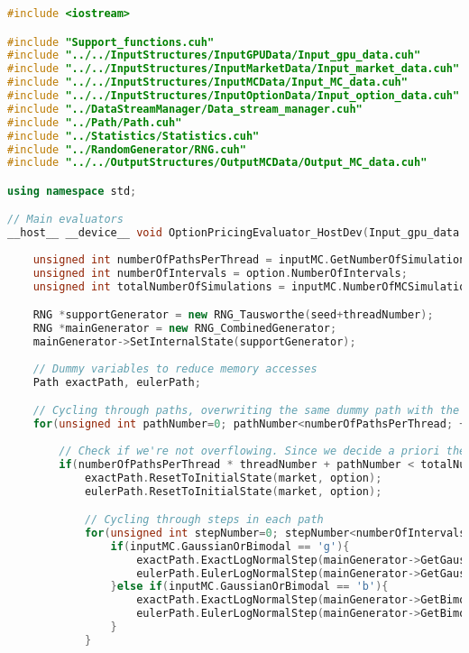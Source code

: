 \begin{lstlisting}[language=C++, caption={\texttt{libraries/CoreLibraries/SupportFunctions/Support\_functions.cu}}]
#include <iostream>

#include "Support_functions.cuh"
#include "../../InputStructures/InputGPUData/Input_gpu_data.cuh"
#include "../../InputStructures/InputMarketData/Input_market_data.cuh"
#include "../../InputStructures/InputMCData/Input_MC_data.cuh"
#include "../../InputStructures/InputOptionData/Input_option_data.cuh"
#include "../DataStreamManager/Data_stream_manager.cuh"
#include "../Path/Path.cuh"
#include "../Statistics/Statistics.cuh"
#include "../RandomGenerator/RNG.cuh"
#include "../../OutputStructures/OutputMCData/Output_MC_data.cuh"

using namespace std;

// Main evaluators
__host__ __device__ void OptionPricingEvaluator_HostDev(Input_gpu_data inputGPU, Input_option_data option, Input_market_data market, Input_MC_data inputMC, Statistics* exactOutputs, Statistics* eulerOutputs, unsigned int seed, unsigned int threadNumber){
	
	unsigned int numberOfPathsPerThread = inputMC.GetNumberOfSimulationsPerThread(inputGPU);
	unsigned int numberOfIntervals = option.NumberOfIntervals;
	unsigned int totalNumberOfSimulations = inputMC.NumberOfMCSimulations;

	RNG *supportGenerator = new RNG_Tausworthe(seed+threadNumber);
	RNG *mainGenerator = new RNG_CombinedGenerator;
	mainGenerator->SetInternalState(supportGenerator);
	
	// Dummy variables to reduce memory accesses
	Path exactPath, eulerPath;

	// Cycling through paths, overwriting the same dummy path with the same template path
	for(unsigned int pathNumber=0; pathNumber<numberOfPathsPerThread; ++pathNumber){
		
		// Check if we're not overflowing. Since we decide a priori the number of simulations, some threads will inevitably work less
		if(numberOfPathsPerThread * threadNumber + pathNumber < totalNumberOfSimulations){
			exactPath.ResetToInitialState(market, option);
			eulerPath.ResetToInitialState(market, option);

			// Cycling through steps in each path
			for(unsigned int stepNumber=0; stepNumber<numberOfIntervals; ++stepNumber){
				if(inputMC.GaussianOrBimodal == 'g'){
					exactPath.ExactLogNormalStep(mainGenerator->GetGauss());
					eulerPath.EulerLogNormalStep(mainGenerator->GetGauss());
				}else if(inputMC.GaussianOrBimodal == 'b'){
					exactPath.ExactLogNormalStep(mainGenerator->GetBimodal());
					eulerPath.EulerLogNormalStep(mainGenerator->GetBimodal());
				}
			}


\end{lstlisting}
